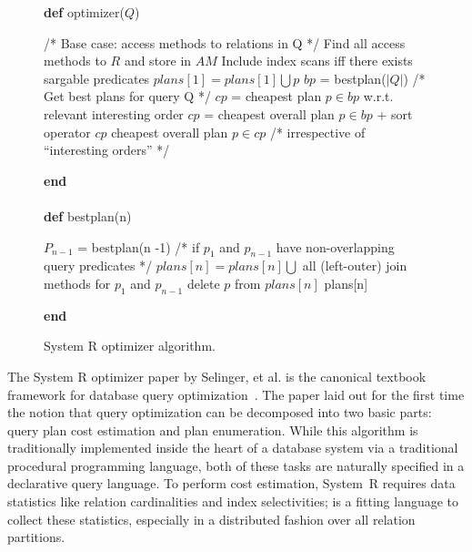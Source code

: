 \begin{figure*}
\ssp
\centering
\begin{boxedminipage}{\linewidth}
  {\bf def} optimizer($Q$)
    \begin{algorithmic}[1]
      	\STATE /* Base case: access methods to relations in Q */
		\STATE Find all access methods to $R$ and store in $AM$
		\STATE Include index scans iff there exists sargable predicates 
  	\ENDFOR
	\STATE
			\STATE $plans[1] = plans[1] \bigcup p$ 
		\ENDIF
 	\ENDFOR
	\STATE
	\STATE $bp$ = bestplan($|Q|$) /* Get best plans for query Q */
	 	\STATE $cp$ = cheapest plan $p \in bp$ w.r.t. relevant interesting order 
			\STATE $cp$ = cheapest overall plan $p \in bp$ + sort operator
		\ENDIF
		\RETURN $cp$
	\ELSE
	 	\RETURN cheapest overall plan $p \in cp$ /* irrespective of ``interesting orders'' */ 
	\ENDIF
    \end{algorithmic}
  {\bf end} \\
  \\
  {\bf def} bestplan(n)
    \begin{algorithmic}[1]
			\STATE $P_{n-1}$ = bestplan(n -1)
			\STATE /* if $p_1$ and $p_{n-1}$ have non-overlapping query predicates */
					\STATE $plans[n] = plans[n] \bigcup$ all (left-outer) join methods for $p_1$ and $p_{n-1}$
				\ENDIF
			\ENDFOR
		\ENDFOR
		\STATE
				\STATE delete $p$ from $plans[n]$
			\ENDIF
		\ENDFOR
	\ENDIF
	\RETURN plans[n]
      \end{algorithmic}
    {\bf end}
\end{boxedminipage}
\caption{\label{ch:opt:fig:systemr}System R optimizer algorithm.}
\end{figure*}

The System R optimizer paper by Selinger, et al.  is the canonical textbook
framework for database query optimization~\cite{selinger}.  The paper laid out
for the first time the notion that query optimization can be decomposed into
two basic parts: query plan cost estimation and plan enumeration.  While this
algorithm is traditionally implemented inside the heart of a database system
via a traditional procedural programming language, both of these tasks are
naturally specified in a declarative query language.  To perform cost
estimation, System~R requires data statistics like relation cardinalities and
index selectivities; \OVERLOG is a fitting language to collect these
statistics, especially in a distributed fashion over all relation partitions.

